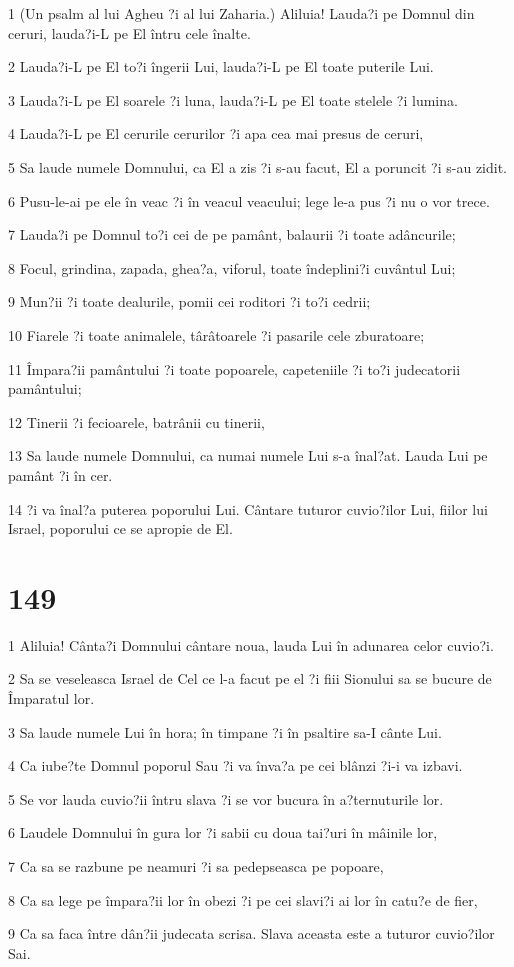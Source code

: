 \par 1 (Un psalm al lui Agheu ?i al lui Zaharia.) Aliluia! Lauda?i pe Domnul din ceruri, lauda?i-L pe El întru cele înalte.
\par 2 Lauda?i-L pe El to?i îngerii Lui, lauda?i-L pe El toate puterile Lui.
\par 3 Lauda?i-L pe El soarele ?i luna, lauda?i-L pe El toate stelele ?i lumina.
\par 4 Lauda?i-L pe El cerurile cerurilor ?i apa cea mai presus de ceruri,
\par 5 Sa laude numele Domnului, ca El a zis ?i s-au facut, El a poruncit ?i s-au zidit.
\par 6 Pusu-le-ai pe ele în veac ?i în veacul veacului; lege le-a pus ?i nu o vor trece.
\par 7 Lauda?i pe Domnul to?i cei de pe pamânt, balaurii ?i toate adâncurile;
\par 8 Focul, grindina, zapada, ghea?a, viforul, toate îndeplini?i cuvântul Lui;
\par 9 Mun?ii ?i toate dealurile, pomii cei roditori ?i to?i cedrii;
\par 10 Fiarele ?i toate animalele, târâtoarele ?i pasarile cele zburatoare;
\par 11 Împara?ii pamântului ?i toate popoarele, capeteniile ?i to?i judecatorii pamântului;
\par 12 Tinerii ?i fecioarele, batrânii cu tinerii,
\par 13 Sa laude numele Domnului, ca numai numele Lui s-a înal?at. Lauda Lui pe pamânt ?i în cer.
\par 14 ?i va înal?a puterea poporului Lui. Cântare tuturor cuvio?ilor Lui, fiilor lui Israel, poporului ce se apropie de El.

\chapter{149}

\par 1 Aliluia! Cânta?i Domnului cântare noua, lauda Lui în adunarea celor cuvio?i.
\par 2 Sa se veseleasca Israel de Cel ce l-a facut pe el ?i fiii Sionului sa se bucure de Împaratul lor.
\par 3 Sa laude numele Lui în hora; în timpane ?i în psaltire sa-I cânte Lui.
\par 4 Ca iube?te Domnul poporul Sau ?i va înva?a pe cei blânzi ?i-i va izbavi.
\par 5 Se vor lauda cuvio?ii întru slava ?i se vor bucura în a?ternuturile lor.
\par 6 Laudele Domnului în gura lor ?i sabii cu doua tai?uri în mâinile lor,
\par 7 Ca sa se razbune pe neamuri ?i sa pedepseasca pe popoare,
\par 8 Ca sa lege pe împara?ii lor în obezi ?i pe cei slavi?i ai lor în catu?e de fier,
\par 9 Ca sa faca între dân?ii judecata scrisa. Slava aceasta este a tuturor cuvio?ilor Sai.

